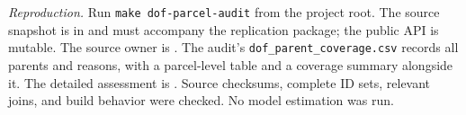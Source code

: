 \small
\textit{Reproduction.} Run \texttt{make dof-parcel-audit} from the project root.
The source snapshot is in  and must
accompany the replication package; the public API is mutable. The source owner
is . The audit's
\texttt{dof\_parent\_coverage.csv} records all parents and reasons, with a
parcel-level table and a coverage summary alongside it. The detailed assessment
is .
Source checksums, complete ID sets, relevant joins, and build behavior were
checked. No model estimation was run.
\normalsize
